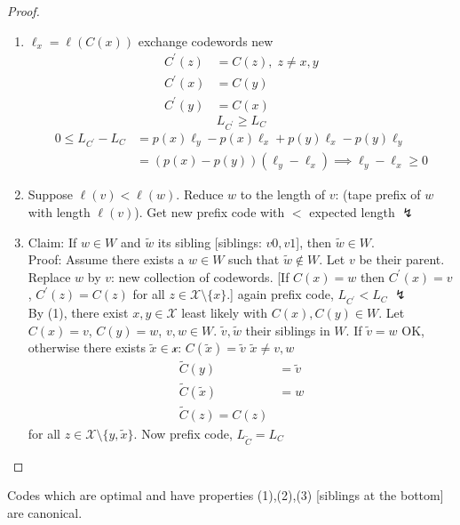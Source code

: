 \documentclass[mfit.tex]{subfiles}
\begin{document}
\begin{proof}
  \begin{enumerate}
    \item $\ell_x = \ell(C(x))$ exchange codewords new
    \begin{align*}
      C^\prime(z) &= C(z),\; z \neq x,y \\
      C^\prime(x) &= C(y) \\
      C^\prime(y) &= C(x)
    \end{align*}
    \[ L_{C^\prime} \geq L_C \]
    \begin{align*}
      0 \leq L_{C^\prime} - L_C &= p(x) \ell_y - p(x) \ell_x + p(y) \ell_x - p(y) \ell_y \\
      &= (p(x) - p(y)) (\ell_y - \ell_x) \implies \ell_y - \ell_x \geq 0
    \end{align*}
    \item Suppose $\ell(v) < \ell(w)$. Reduce $w$ to the length of $v$: (tape prefix of $w$ with length $\ell(v)$).
    Get new prefix code with $<$ expected length $\lightning$
    \item Claim: If $w \in W$ and $\tilde{w}$ its sibling [siblings: $v0,v1$], then $\tilde{w} \in W$.\\
    
    Proof: Assume there exists a $w \in W$ such that $\tilde{w} \notin W$.
    Let $v$ be their parent. Replace $w$ by $v$: new collection of codewords.
    [If $C(x) = w$ then $C^\prime(x) = v$, $C^\prime(z) = C(z)$ for all $z \in \mathcal{X} \setminus \{x\}$.]
    again prefix code, $L_{C^\prime} < L_C$ $\lightning$
    \\
    
    By (1), there exist $x,y \in \mathcal{X}$ least likely with $C(x),C(y) \in W$.
    Let $C(x) = v$, $C(y) = w$, $v,w \in W$.
    $\tilde{v},\tilde{w}$ their siblings in $W$.
    If $\tilde{v} = w$ OK, otherwise
    there exists $\tilde{x} \in \mathcal{x}$: $C(\tilde{x}) = \tilde{v}$ $\tilde{x} \neq v,w$
    \begin{align*}
      \tilde{C}(y) &= \tilde{v} \\
      \tilde{C}(\tilde{x}) &= w \\
      \tilde{C}(z) = C(z)
    \end{align*}
    for all $z \in \mathcal{X} \setminus \{y,\tilde{x} \}$.
    Now prefix code, $L_{\tilde{C}} = L_C$
  \end{enumerate}
\end{proof}

\begin{defi*}
  Codes which are optimal and have properties (1),(2),(3) [siblings at the bottom] are canonical.
\end{defi*}
\end{document}
